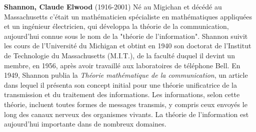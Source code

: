\textbf{Shannon, Claude Elwood} (1916-2001) Né au Migichan et décédé au Massachusetts c'était un mathématicien spécialiste en mathématiques appliquées et un ingénieur électricien, qui développa la théorie de la communication, aujourd'hui connue sous le nom de la "théorie de l'information". Shannon suivit les cours de l'Université du Michigan et obtint en 1940 son doctorat de l'Institut de Technologie du Massachusetts (M.I.T.), de la faculté duquel il devint un membre, en 1956, après avoir travaillé aux laboratoires de téléphone Bell. En 1949, Shannon publia la \textit{Théorie mathématique de la communication}, un article dans lequel il présenta son concept initial pour une théorie unificatrice de la transmission et du traitement des informations. Les informations, selon cette théorie, incluent toutes formes de messages transmis, y compris ceux envoyés le long des canaux nerveux des organismes vivants. La théorie de l'information est aujourd'hui importante dans de nombreux domaines.



